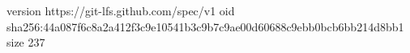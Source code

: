 version https://git-lfs.github.com/spec/v1
oid sha256:44a087f6c8a2a412f3c9e10541b3c9b7c9ae00d60688c9ebb0bcb6bb214d8bb1
size 237
